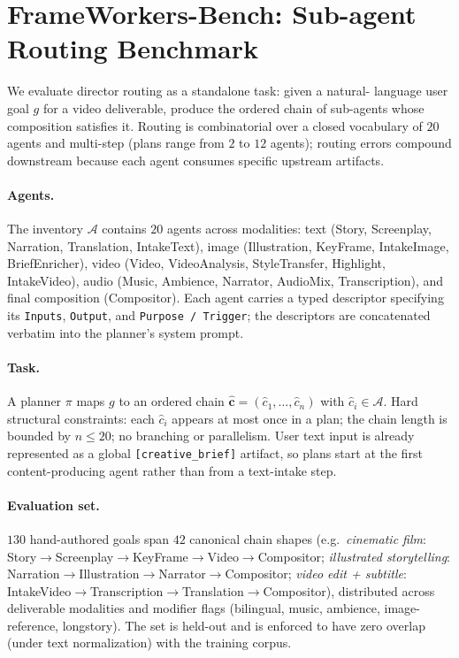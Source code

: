 \section{FrameWorkers-Bench: Sub-agent Routing Benchmark}
\label{sec:bench}

We evaluate director routing as a standalone task: given a natural-
language user goal $g$ for a video deliverable, produce the ordered
chain of sub-agents whose composition satisfies it. Routing is
combinatorial over a closed vocabulary of $20$ agents and multi-step
(plans range from $2$ to $12$ agents); routing errors compound
downstream because each agent consumes specific upstream artifacts.

\paragraph{Agents.}
The inventory $\mathcal{A}$ contains $20$ agents across modalities:
text (Story, Screenplay, Narration, Translation, IntakeText), image
(Illustration, KeyFrame, IntakeImage, BriefEnricher), video (Video,
VideoAnalysis, StyleTransfer, Highlight, IntakeVideo), audio (Music,
Ambience, Narrator, AudioMix, Transcription), and final composition
(Compositor). Each agent carries a typed descriptor specifying its
\texttt{Inputs}, \texttt{Output}, and \texttt{Purpose / Trigger}; the
descriptors are concatenated verbatim into the planner's system prompt.

\paragraph{Task.}
A planner $\pi$ maps $g$ to an ordered chain
$\hat{\mathbf{c}} = (\hat{c}_1, \dots, \hat{c}_n)$ with
$\hat{c}_i\!\in\!\mathcal{A}$. Hard structural constraints: each
$\hat{c}_i$ appears at most once in a plan; the chain length is bounded
by $n\!\le\!20$; no branching or parallelism. User text input is
already represented as a global \texttt{[creative\_brief]} artifact, so
plans start at the first content-producing agent rather than from a
text-intake step.

\paragraph{Evaluation set.}
$130$ hand-authored goals span $42$ canonical chain shapes
(e.g.\ \emph{cinematic film}: Story$\to$Screenplay$\to$KeyFrame$\to$Video$\to$Compositor;
\emph{illustrated storytelling}: Narration$\to$Illustration$\to$Narrator$\to$Compositor;
\emph{video edit + subtitle}: IntakeVideo$\to$Transcription$\to$Translation$\to$Compositor),
distributed across deliverable modalities and modifier flags
(bilingual, music, ambience, image-reference, longstory). The set is
held-out and is enforced to have zero overlap (under text
normalization) with the training corpus.

